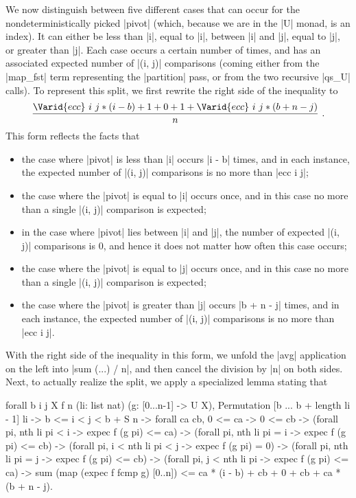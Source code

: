 \documentclass[runningheads]{llncs}
\begin{document}
We now distinguish between five different cases that can occur for the nondeterministically picked |pivot| (which, because we are in the |U| monad, is an index). It can either be less than |i|, equal to |i|, between |i| and |j|, equal to |j|, or greater than |j|. Each case occurs a certain number of times, and has an associated expected number of |(i, j)| comparisons (coming either from the |map_fst| term representing the |partition| pass, or from the two recursive |qs_U| calls). To represent this split, we first rewrite the right side of the inequality to\[\frac{\Varid{ecc}\ i\ j * (i - b) + 1 + 0 + 1 + \Varid{ecc}\ i\ j * (b + n - j)}{n}\ .\]
This form reflects the facts that
\begin{itemize}
\item the case where |pivot| is less than |i| occurs |i - b| times, and in each instance, the expected number of |(i, j)| comparisons is no more than |ecc i j|;
\item the case where the |pivot| is equal to |i| occurs once, and in this case no more than a single |(i, j)| comparison is expected;
\item in the case where |pivot| lies between |i| and |j|, the number of expected |(i, j)| comparisons is 0, and hence it does not matter how often this case occurs;
\item the case where the |pivot| is equal to |j| occurs once, and in this case no more than a single |(i, j)| comparison is expected;
\item the case where the |pivot| is greater than |j| occurs |b + n - j| times, and in each instance, the expected number of |(i, j)| comparisons is no more than |ecc i j|.
\end{itemize}
With the right side of the inequality in this form, we unfold the |avg| application on the left into |sum (...) / n|, and then cancel the division by |n| on both sides. Next, to actually realize the split, we apply a specialized lemma stating that
\begin{code}
   forall b i j X f n (li: list nat)
     (g: [0...n-1] -> U X), Permutation [b ... b + length li - 1] li ->
    b <= i < j < b + S n -> forall ca cb, 0 <= ca -> 0 <= cb ->
    (forall pi, nth li pi < i -> expec f (g pi) <= ca) ->
    (forall pi, nth li pi = i -> expec f (g pi) <= cb) ->
    (forall pi, i < nth li pi < j -> expec f (g pi) = 0) ->
    (forall pi, nth li pi = j -> expec f (g pi) <= cb) ->
    (forall pi, j < nth li pi -> expec f (g pi) <= ca) ->
      sum (map (expec f fcmp g) [0..n]) <=
        ca * (i - b) + cb + 0 + cb + ca * (b + n - j).
\end{code}
\end{document}
